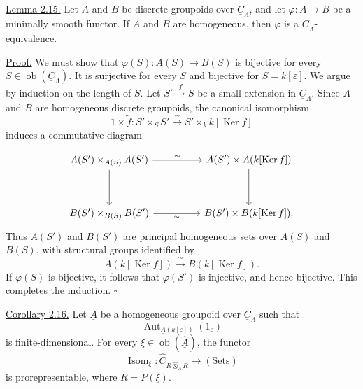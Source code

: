\underline{Lemma 2.15.} Let $A$ and $B$ be discrete groupoids over
$\underline C_\Lambda$, and let $\varphi:A\longrightarrow B$ be a
minimally smooth functor. If $A$ and $B$ are homogeneous, then
$\varphi$ is a $\underline C_\Lambda$-equivalence.

\underline{Proof.} We must show that
$\varphi(S):A(S)\longrightarrow B(S)$ is bijective for every
$S\in\operatorname{ob}(\underline C_\Lambda)$. It is surjective for
every $S$ and bijective for $S=k[\varepsilon]$. We argue by induction
on the length of $S$. Let $S'\xrightarrow fS$ be a small extension
in $\underline C_\Lambda$. Since $A$ and $B$ are homogeneous
discrete groupoids, the canonical isomorphism
\[
 1\times\widetilde f:S'\times_SS'
 \xrightarrow{\ \sim\ }S'\times_k k[\operatorname{Ker}f]
\]
induces a commutative diagram


\[
\begin{tikzcd}[column sep=huge,row sep=huge]
 A(S')\times_{A(S)}A(S') \arrow[r,"\sim"] \arrow[d]
 & A(S')\times A(k[\operatorname{Ker}f]) \arrow[d]\\
 B(S')\times_{B(S)}B(S') \arrow[r,"\sim"']
 & B(S')\times B(k[\operatorname{Ker}f]).
\end{tikzcd}
\]
Thus $A(S')$ and $B(S')$ are principal homogeneous sets over $A(S)$
and $B(S)$, with structural groups identified by
\[
 A(k[\operatorname{Ker}f])\xrightarrow{\ \sim\ }
 B(k[\operatorname{Ker}f]).
\]
If $\varphi(S)$ is bijective, it follows that $\varphi(S')$ is
injective, and hence bijective. This completes the induction.
\hfill$\square$

\underline{Corollary 2.16.} Let $\underline A$ be a homogeneous
groupoid over $\underline C_\Lambda$ such that
\[
 \operatorname{Aut}_{\underline A(k[\varepsilon])}(1_\varepsilon)
\]
is finite-dimensional. For every
$\xi\in\operatorname{ob}(\widehat{\underline A})$, the functor
\[
 \operatorname{Isom}_\xi:
 \widehat{\underline C}_{R\widehat\otimes_\Lambda R}
 \longrightarrow(\mathrm{Sets})
\]
is prorepresentable, where $R=P(\xi)$.

